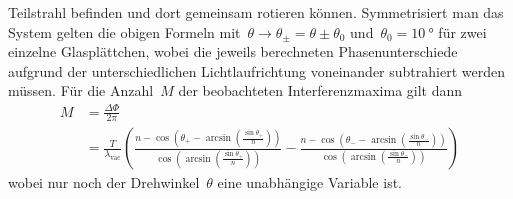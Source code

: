 Teilstrahl befinden und dort gemeinsam rotieren können. Symmetrisiert man das
System gelten die obigen Formeln
mit~$\theta\rightarrow\theta_{\pm}=\theta\pm\theta_0$
und~$\theta_0=\SI{10}{\degree}$ für zwei einzelne Glasplättchen, wobei die
jeweils berechneten Phasenunterschiede aufgrund der unterschiedlichen
Lichtlaufrichtung voneinander subtrahiert werden müssen. Für die Anzahl~$M$ der
beobachteten Interferenzmaxima gilt dann
\begin{align}
  M&=\frac{\Delta\Phi}{2\pi} \\
  &=\frac{T}{\lambda_{\text{vac}}}\left(\frac{n-\cos\left(\theta_{+}
  -\arcsin\left(\frac{\sin\theta_{+}}{n}\right)\right)}{\cos\left(\arcsin\left(
  \frac{\sin\theta_{+}}{n}\right)\right)}-\frac{n-\cos\left(\theta_{-}-\arcsin
  \left(\frac{\sin\theta_{-}}{n}\right)\right)}{\cos\left(\arcsin\left(
  \frac{\sin\theta_{-}}{n}\right)\right)}\right)
\end{align}
wobei nur noch der Drehwinkel~$\theta$ eine unabhängige Variable ist.
